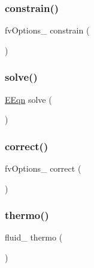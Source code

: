 \subsubsection{\texorpdfstring{constrain()}{constrain()}}
{\footnotesize\ttfamily fv\+Options\+\_\+ constrain (\begin{DoxyParamCaption}\item[{\hyperlink{EEqn__1pl_8H_afbe3b0df5936ee9102f8bea26f93e95a}{E\+Eqn}}]{ }\end{DoxyParamCaption})}

\mbox{\label{EEqn__1pl_8H_ac123867940006fb14e8346d9bdc38f8d}} 
\subsubsection{\texorpdfstring{solve()}{solve()}}
{\footnotesize\ttfamily \hyperlink{EEqn__1pl_8H_afbe3b0df5936ee9102f8bea26f93e95a}{E\+Eqn} solve (\begin{DoxyParamCaption}{ }\end{DoxyParamCaption})}

\mbox{\label{EEqn__1pl_8H_aa9a0425f27ee9f8374f7b6896dc8bacc}} 
\subsubsection{\texorpdfstring{correct()}{correct()}\hspace{0.1cm}{\footnotesize\ttfamily [2/2]}}
{\footnotesize\ttfamily fv\+Options\+\_\+ correct (\begin{DoxyParamCaption}\item[{\hyperlink{EEqn__1pl_8H_aaacc8fea926e2b83e418a1ad3c1e8c43}{he}}]{ }\end{DoxyParamCaption})}

\mbox{\label{EEqn__1pl_8H_a353366dbdc7c1ce1987281023b85fa83}} 
\subsubsection{\texorpdfstring{thermo()}{thermo()}}
{\footnotesize\ttfamily fluid\+\_\+ thermo (\begin{DoxyParamCaption}{ }\end{DoxyParamCaption})}

